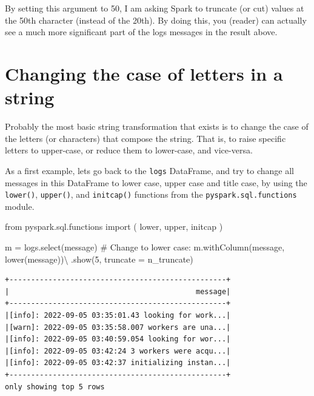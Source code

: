 \documentclass[
  11pt,
  letterpaper,
  DIV=11,
  numbers=noendperiod]{scrreprt}
\newenvironment{Shaded}{\begin{snugshade}}{\end{snugshade}}
\newcommand{\CommentTok}[1]{\textcolor[rgb]{0.37,0.37,0.37}{#1}}
\newcommand{\DecValTok}[1]{\textcolor[rgb]{0.68,0.00,0.00}{#1}}
\newcommand{\ImportTok}[1]{\textcolor[rgb]{0.00,0.46,0.62}{#1}}
\newcommand{\NormalTok}[1]{\textcolor[rgb]{0.00,0.23,0.31}{#1}}
\newcommand{\OperatorTok}[1]{\textcolor[rgb]{0.37,0.37,0.37}{#1}}
\newcommand{\StringTok}[1]{\textcolor[rgb]{0.13,0.47,0.30}{#1}}
\begin{document}
By setting this argument to 50, I am asking Spark to truncate (or cut)
values at the 50th character (instead of the 20th). By doing this, you
(reader) can actually see a much more significant part of the logs
messages in the result above.

\hypertarget{changing-the-case-of-letters-in-a-string}{%
\section{Changing the case of letters in a
string}\label{changing-the-case-of-letters-in-a-string}}

Probably the most basic string transformation that exists is to change
the case of the letters (or characters) that compose the string. That
is, to raise specific letters to upper-case, or reduce them to
lower-case, and vice-versa.

As a first example, lets go back to the \texttt{logs} DataFrame, and try
to change all messages in this DataFrame to lower case, upper case and
title case, by using the \texttt{lower()}, \texttt{upper()}, and
\texttt{initcap()} functions from the \texttt{pyspark.sql.functions}
module.

\begin{Shaded}
\begin{Highlighting}[]
\ImportTok{from}\NormalTok{ pyspark.sql.functions }\ImportTok{import}\NormalTok{ (}
\NormalTok{    lower,}
\NormalTok{    upper,}
\NormalTok{    initcap}
\NormalTok{)}

\NormalTok{m }\OperatorTok{=}\NormalTok{ logs.select(}\StringTok{\textquotesingle{}message\textquotesingle{}}\NormalTok{)}
\CommentTok{\# Change to lower case:}
\NormalTok{m.withColumn(}\StringTok{\textquotesingle{}message\textquotesingle{}}\NormalTok{, lower(}\StringTok{\textquotesingle{}message\textquotesingle{}}\NormalTok{))}\OperatorTok{\textbackslash{}}
\NormalTok{    .show(}\DecValTok{5}\NormalTok{, truncate }\OperatorTok{=}\NormalTok{ n\_truncate)}
\end{Highlighting}
\end{Shaded}

\begin{verbatim}
+--------------------------------------------------+
|                                           message|
+--------------------------------------------------+
|[info]: 2022-09-05 03:35:01.43 looking for work...|
|[warn]: 2022-09-05 03:35:58.007 workers are una...|
|[info]: 2022-09-05 03:40:59.054 looking for wor...|
|[info]: 2022-09-05 03:42:24 3 workers were acqu...|
|[info]: 2022-09-05 03:42:37 initializing instan...|
+--------------------------------------------------+
only showing top 5 rows
\end{verbatim}
\end{document}

